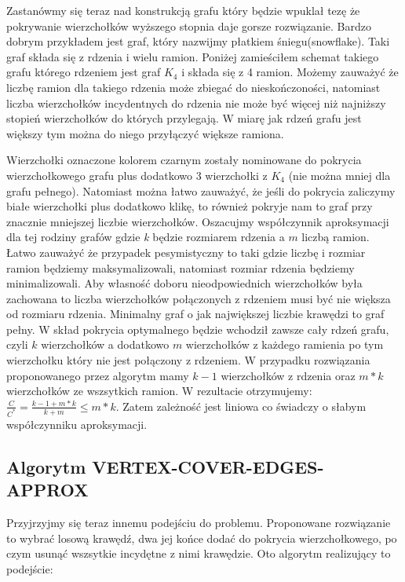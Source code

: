 	

	Zastanówmy się teraz nad konstrukcją grafu który będzie wpuklał tezę że pokrywanie wierzchołków wyższego stopnia daje gorsze rozwiązanie. Bardzo dobrym przykładem jest graf, który nazwijmy płatkiem śniegu(snowflake). Taki graf składa się z rdzenia i wielu ramion. Poniżej zamieściłem schemat takiego grafu którego rdzeniem jest graf $K_{4}$ i składa się z 4 ramion. Możemy zauważyć że liczbę ramion dla takiego rdzenia może zbiegać do nieskończoności, natomiast liczba wierzchołków incydentnych do rdzenia nie może być więcej niż najniższy stopień wierzchołków do których przylegają. W miarę jak rdzeń grafu jest większy tym można do niego przyłączyć większe ramiona.

	
	
	Wierzchołki oznaczone kolorem czarnym zostały nominowane do pokrycia wierzchołkowego grafu plus dodatkowo 3 wierzchołki z $K_{4}$ (nie można mniej dla grafu pełnego). Natomiast można łatwo zauważyć, że jeśli do pokrycia zaliczymy białe wierzchołki plus dodatkowo klikę, to również pokryje nam to graf przy znacznie mniejszej liczbie wierzchołków.
	Oszacujmy współczynnik aproksymacji dla tej rodziny grafów gdzie \textit{k} będzie rozmiarem rdzenia a $m$ liczbą  ramion. Łatwo zauważyć że przypadek pesymistyczny to taki gdzie liczbę i rozmiar ramion będziemy maksymalizowali, natomiast rozmiar rdzenia będziemy minimalizowali. Aby własność doboru nieodpowiednich wierzchołków była zachowana to liczba wierzchołków połączonych z rdzeniem musi być nie większa od rozmiaru rdzenia.  Minimalny graf o jak największej liczbie krawędzi to graf pełny.
	 W skład pokrycia optymalnego będzie wchodził zawsze cały rdzeń grafu, czyli $k$ wierzchołków a dodatkowo $m$ wierzchołków z każdego ramienia po tym wierzchołku który nie jest połączony z rdzeniem. W przypadku rozwiązania proponowanego przez algorytm mamy $k-1$ wierzchołków z rdzenia oraz $m*k$ wierzchołków ze wszsytkich ramion. W rezultacie otrzymujemy: $\frac{C}{C^{*}} = \frac{k-1 + m*k}{k+m} \le m*k$. Zatem zależność jest liniowa co świadczy o słabym współczynniku aproksymacji.

\subsection{Algorytm VERTEX-COVER-EDGES-APPROX}

	 Przyjrzyjmy się teraz innemu podejściu do problemu. Proponowane rozwiązanie to wybrać losową krawędź, dwa jej końce dodać do pokrycia wierzchołkowego, po czym usunąć wszsytkie incydętne z nimi krawędzie. Oto algorytm realizujący to podejście:

